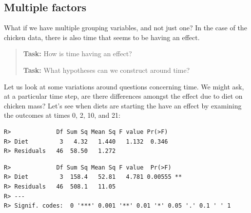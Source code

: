 \documentclass[english,10pt,a4paper,oneside]{book}
\newenvironment{Shaded}{\begin{snugshade}}{\end{snugshade}}
\newcommand{\DataTypeTok}[1]{\textcolor[rgb]{0.13,0.29,0.53}{#1}}
\newcommand{\DecValTok}[1]{\textcolor[rgb]{0.00,0.00,0.81}{#1}}
\newcommand{\KeywordTok}[1]{\textcolor[rgb]{0.13,0.29,0.53}{\textbf{#1}}}
\newcommand{\NormalTok}[1]{#1}
\newcommand{\OperatorTok}[1]{\textcolor[rgb]{0.81,0.36,0.00}{\textbf{#1}}}
\newcommand{\StringTok}[1]{\textcolor[rgb]{0.31,0.60,0.02}{#1}}
\theoremstyle{definition}
\theoremstyle{definition}
\theoremstyle{definition}
\theoremstyle{remark}
\begin{document}
\hypertarget{multiple-factors}{%
\subsection{Multiple factors}\label{multiple-factors}}

What if we have multiple grouping variables, and not just one? In the
case of the chicken data, there is also time that seems to be having an
effect.

\begin{quote}
\textbf{Task:} How is time having an effect?

\textbf{Task:} What hypotheses can we construct around time?
\end{quote}

Let us look at some variations around questions concerning time. We
might ask, at a particular time step, are there differences amongst the
effect due to diet on chicken mass? Let's see when diets are starting
the have an effect by examining the outcomes at times 0, 2, 10, and 21:

\begin{Shaded}
\end{Shaded}

\begin{verbatim}
R>             Df Sum Sq Mean Sq F value Pr(>F)
R> Diet         3   4.32   1.440   1.132  0.346
R> Residuals   46  58.50   1.272
\end{verbatim}

\begin{Shaded}
\end{Shaded}

\begin{verbatim}
R>             Df Sum Sq Mean Sq F value  Pr(>F)   
R> Diet         3  158.4   52.81   4.781 0.00555 **
R> Residuals   46  508.1   11.05                   
R> ---
R> Signif. codes:  0 '***' 0.001 '**' 0.01 '*' 0.05 '.' 0.1 ' ' 1
\end{verbatim}
\end{document}
